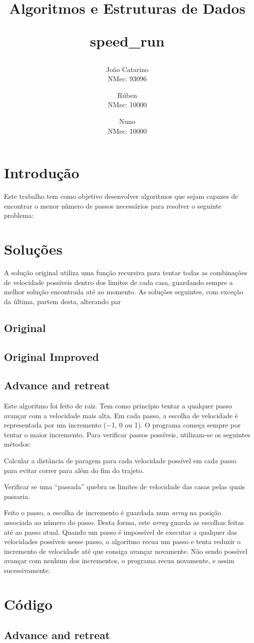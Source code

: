 \documentclass[11pt,a4paper,titlepage]{article}
\title{
	\textbf{Algoritmos e Estruturas de Dados}

	speed\_run
}
\author{
	João Catarino\\
	NMec: 93096
	\and
	Rúben\\
	NMec: 10000
	\and
	Nuno\\
	NMec: 10000
}
\newcommand{\extrang}[1]{\textit{#1}}
\newcommand{\srcdir}{..}
\begin{document}
\setcounter{secnumdepth}{1}
\maketitle
\section{Introdução}
Este trabalho tem como objetivo desenvolver algoritmos que sejam capazes
de encontrar o menor número de passos necessários para resolver o seguinte problema:
\section{Soluções}
A solução original utiliza uma função recursiva para tentar todas as combinações
de velocidade possíveis dentro dos limites de cada casa, guardando sempre a melhor solução encontrada até ao momento.
As soluções seguintes, com exceção da última, partem desta, alterando par
\subsection{Original}
\subsection{Original Improved}
\subsection{Advance and retreat}
Este algoritmo foi feito de raiz. Tem como
princípio tentar a qualquer passo avançar com a velocidade mais alta.
Em cada passo, a escolha de velocidade é representada por um incremento
($-$1, 0 ou 1). O programa começa sempre por tentar o maior incremento.
Para verificar passos possíveis, utilizam-se os seguintes métodos:

Calcular a distância de paragem para cada velocidade possível em cada passo para evitar correr para além do fim do
trajeto.

Verificar se uma ``passada'' quebra os limites de velocidade das casas
pelas quais passaria.

Feito o passo, a escolha de incremento é guardada num \extrang{array}
na posição associada ao número do passo. Desta forma, este \extrang{array}
guarda as escolhas feitas até ao passo atual.
Quando um passo é impossível de executar a qualquer das velocidades possíveis nesse
passo, o algoritmo recua um passo e tenta reduzir o incremento de velocidade até que
consiga avançar novamente. Não sendo possível avançar com nenhum dos incrementos,
o programa recua novamente, e assim sucessivamente.
\section{Código}
\subsection{Advance and retreat}

\end{document}
